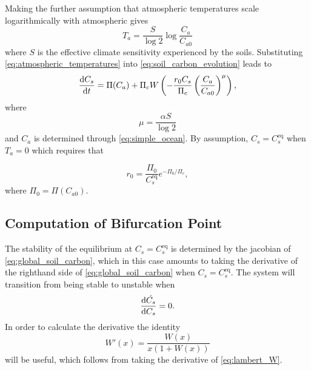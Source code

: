 Making the further assumption that atmospheric temperatures scale logarithmically with atmospheric  \parencite{Pierrehumbert2010} gives
\begin{equation}
  \label{eq:atmospheric_temperatures}
  T_a = \frac{S}{\log 2} \log \frac{C_a}{C_{a0}} 
\end{equation}
where $S$ is the effective climate sensitivity experienced by the soils. Substituting \cref{eq:atmospheric_temperatures} into \cref{eq:soil_carbon_evolution} 
leads to
\begin{equation}
  \label{eq:global_soil_carbon}
  \dv{C_s}{t} = \Pi(C_a) + \Pi_c W\left(-\frac{r_0C_s}{\Pi_c} \left(\frac{C_a}{C_{a0}}\right)^\mu \right),
\end{equation}
where
\begin{equation}
  \label{eq:mu}
  \mu = \frac{\alpha S}{\log 2}
\end{equation}
and $C_a$ is determined through \cref{eq:simple_ocean}. By assumption, $C_s = C_s^{\mathrm{eq}}$ when $T_a = 0$ which requires that 

\begin{equation}
  r_0 = \frac{\Pi_0}{C_s^{\mathrm{eq}}}e^{-\Pi_0/\Pi_c}, 
\end{equation}
where $\Pi_0 = \Pi\left(C_{a0}\right)$.


\subsection{Computation of Bifurcation Point}
The stability of the equilibrium at $C_s = C_s^{\mathrm{eq}}$ is determined by the jacobian of \cref{eq:global_soil_carbon}, which in this case amounts to
taking the derivative of the righthand side of \cref{eq:global_soil_carbon} when $C_s = C_s^{\mathrm{eq}}$. The system will transition from being stable to unstable when
\begin{equation*}
  \dv{\dot{C_s}}{C_s} = 0.
\end{equation*}
In order to calculate the derivative the identity
\begin{equation}
  \label{eq:derivative_of_lambert_W}
  W'(x) = \frac{W(x)}{x\left(1 + W\left(x\right)\right)}
\end{equation}
will be useful, which follows from taking the derivative of \cref{eq:lambert_W}.

